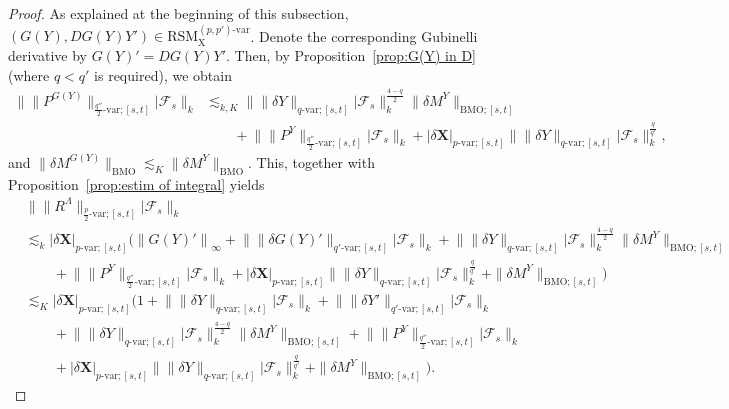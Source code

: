 \documentclass[11pt,reqno]{amsart}
\numberwithin{equation}{section}
\begin{document}
\begin{proof}
As explained at the beginning of this subsection, $(G(Y), DG(Y) Y') \in \mathrm{RSM}^{(p,p')\text{-}\mathrm{var}}_{\mathrm X}$. Denote the corresponding Gubinelli derivative by $G(Y)' = DG(Y) Y'$. Then, by Proposition~\ref{prop:G(Y) in D} (where $q < q'$ is required), we obtain  
\begin{equation*}
\begin{aligned}
\big\|\|P^{G(Y)}\|_{\frac{q''}{2}\text{-var};[s,t]}\big|\mathcal F_{s}\big\|_{k} &\lesssim_{k,K} \big\|\|\delta Y\|_{q\text{-var};[s,t]}\big|\mathcal F_{s}\big\|^{\frac{4-q}{2}}_{k}\|\delta M^{Y}\|_{\mathrm{BMO};[s,t]} \\
&\qquad  + \big\|\|P^Y\|_{\frac{q''}{2}\text{-var};[s,t]}\big|\mathcal F_{s}\big\|_{k} + |\delta \mathbf X|_{p\text{-var};[s,t]} \big\|\|\delta  Y\|_{q\text{-var};[s,t]}\big|\mathcal F_{s}\big\|^{\frac{q}{q'}}_{k},
\end{aligned}
\end{equation*}
and $\|\delta M^{G(Y)}\|_{\mathrm{BMO}} \lesssim_{K} \|\delta M^{Y}\|_{\mathrm{BMO}}$. This, together with Proposition~\ref{prop:estim of integral} yields
\begin{align*}\nonumber
&\big\|\|R^{\Lambda}\|_{\frac{p}{2}\text{-}\mathrm{var};[s,t]} \big| \mathcal F_{s}\big\|_{k} \\ \nonumber
& \lesssim_{k} |\delta \mathbf X|_{p\text{-}\mathrm{var};[s,t]} \Big( \left\|G(Y)'\right\|_{\infty} + \big\|\|\delta G(Y)'\|_{q'\text{-var};[s,t]}\big|\mathcal F_{s}\big\|_{k} + \big\|\|\delta Y\|_{q\text{-var};[s,t]} \big|\mathcal F_{s}\big\|^{\frac{4-q}{2}}_{k} \|\delta M^{Y}\|_{\mathrm{BMO};[s,t]} \\
& \qquad + \big\|  \|P^Y\|_{\frac{q''}{2}\text{-}\mathrm{var};[s,t]}\big|\mathcal F_{s}\big\|_{k} +  |\delta \mathbf X|_{p\text{-var};[s,t]} \big\|\|\delta Y\|_{q\text{-var};[s,t]} \big|\mathcal F_{s}\big\|^{\frac{q}{q'}}_{k} + \|\delta M^{Y}\|_{\mathrm{BMO};[s,t]} \Big)\\ \nonumber
& \lesssim_{K} |\delta \mathbf X|_{p\text{-}\mathrm{var};[s,t]} \Big( 1 + \big\| \|\delta Y\|_{q\text{-var};[s,t]}\big|\mathcal F_{s}\big\|_{k} 
 + \big\| \|\delta Y'\|_{q'\text{-var};[s,t]}\big|\mathcal F_{s}\big\|_{k}\\ \nonumber
& \qquad + \big\|\|\delta Y\|_{q\text{-var};[s,t]}\big|\mathcal F_{s}\big\|^{\frac{4-q}{2}}_{k}  \|\delta M^{Y}\|_{\mathrm{BMO};[s,t]} + \big\| \|P^Y\|_{\frac{q''}{2}\text{-}\mathrm{var};[s,t]}\big|\mathcal F_{s}\big\|_{k} \\
&\qquad +  |\delta \mathbf X|_{p\text{-var};[s,t]} \big\|\|\delta Y\|_{q\text{-var};[s,t]} \big|\mathcal F_{s}\big\|^{\frac{q}{q'}}_{k} + \|\delta M^{Y}\|_{\mathrm{BMO};[s,t]}\Big).
\end{align*}


\end{proof}
\end{document}
